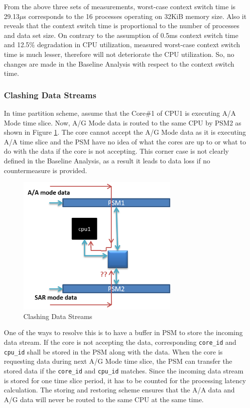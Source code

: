 From the above three sets of measurements, worst-case context switch time is 29.13$\mu$s corresponds to the 16 processes operating on 32KiB memory size. Also it reveals that the context switch time is proportional to the number of processes and data set size. On contrary to the assumption of 0.5ms context switch time and 12.5\% degradation in CPU utilization, measured worst-case context switch time is much lesser, therefore will not deteriorate the CPU utilization. So, no changes are made in the Baseline Analysis with respect to the context switch time.

\subsubsection{Clashing Data Streams}
In time partition scheme, assume that the Core\#1 of CPU1 is executing A/A Mode time slice. Now, A/G Mode data is routed to the same CPU by PSM2 as shown in Figure \ref{fig:mm:data_clash}. The core cannot accept the A/G Mode data as it is executing A/A time slice and the PSM have no idea of what the cores are up to or what to do with the data if the core is not accepting. This corner case is not clearly defined in the Baseline Analysis, as a result it leads to data loss if no countermeasure is provided.

\begin{figure}[h!]
	\centering
	\includegraphics[width=80mm]{figures/data_clash}
	\caption{Clashing Data Streams}
	\label{fig:mm:data_clash}
\end{figure}

One of the ways to resolve this is to have a buffer in PSM to store the incoming data stream. If the core is not accepting the data, corresponding \verb|core_id| and \verb|cpu_id| shall be stored in the PSM along with the data. When the core is requesting data during next A/G Mode time slice, the PSM can transfer the stored data if the \verb|core_id| and \verb|cpu_id| matches. Since the incoming data stream is stored for one time slice period, it has to be counted for the processing latency calculation. The storing and restoring scheme ensures that the A/A data and A/G data will never be routed to the same CPU at the same time.

